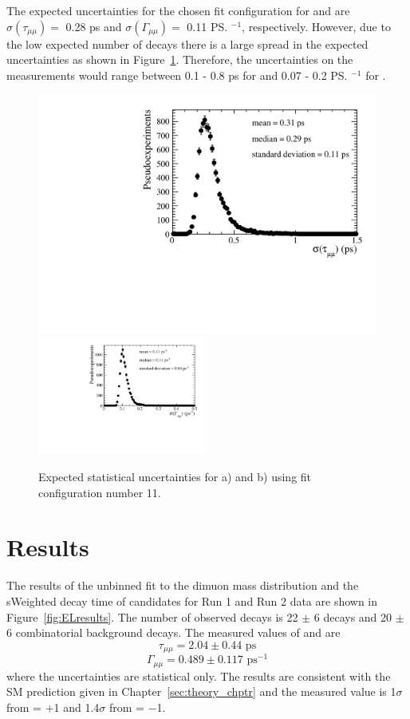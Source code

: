 {The expected uncertainties for the chosen fit configuration for \tmumu and \Gmumu are $\sigma \left ( \tau_{\mu\mu}  \right ) = $ 0.28 ps and  $\sigma \left ( \Gamma_{\mu\mu}  \right ) = $ 0.11 \ps$^{-1}$, respectively. However, due to the low expected number of decays there is a large spread in the expected uncertainties as shown in Figure~\ref{fig:exptuncert}. Therefore, the uncertainties on the measurements would range between 0.1 - 0.8 ps for \tmumu and 0.07 - 0.2 \ps$^{-1}$ for \Gmumu.


\begin{figure}[tbp]
    \centering
        \includegraphics[width=0.49 \textwidth]{./Figs/LifetimeMeasurement/5320-6000_tau_err.pdf}
        \includegraphics[width=0.49\textwidth]{./Figs/LifetimeMeasurement/5320-6000_gamma_err.pdf}

    \caption{Expected statistical uncertainties for a) \tmumu and b) \Gmumu using fit configuration number 11.}
    \label{fig:exptuncert}
\end{figure}


\section{Results}
\label{sec:ELresults}

The results of the unbinned \ml fit to the dimuon mass distribution and the sWeighted decay time of \bsmumu candidates for Run 1 and Run 2 data are shown in Figure~\ref{fig:ELresults}. The number of observed decays is 22 $\pm$ 6 \bsmumu decays and 20 $\pm$ 6 combinatorial background decays. The measured values of \tmumu and \Gmumu are
\begin{equation}
\tau_{\mu\mu} = 2.04 \pm 0.44  \text{ ps} 
\end{equation}
\begin{equation}
\Gamma_{\mu\mu} = 0.489  \pm 0.117 \text{ ps}^{-1}
\end{equation}
where the uncertainties are statistical only. The results are consistent with the SM prediction given in Chapter~\ref{sec:theory_chptr} and the measured value is 1$\sigma$ from \ADG = +1 and 1.4$\sigma$ from \ADG = $-$1. 

}
